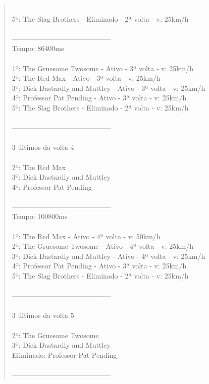 \documentclass[paper=a4, fontsize=11pt]{scrartcl}
\numberwithin{equation}{section}		%
\numberwithin{figure}{section}			%
\numberwithin{table}{section}				%
\begin{document}
\begin{quote}
\\5º: The Slag Brothers - Eliminado - 2ª volta - v: 25km/h
\\
\\------------------------------------------
\\Tempo: 86400ms
\\
\\1º: The Gruesome Twosome - Ativo - 3ª volta - v: 25km/h
\\2º: The Red Max - Ativo - 3ª volta - v: 25km/h
\\3º: Dick Dastardly and Muttley - Ativo - 3ª volta - v: 25km/h
\\4º: Professor Pat Pending - Ativo - 3ª volta - v: 25km/h
\\5º: The Slag Brothers - Eliminado - 2ª volta - v: 25km/h
\\
\\------------------------------------------
\\
\\3 últimos da volta 4
\\
\\2º: The Red Max
\\3º: Dick Dastardly and Muttley
\\4º: Professor Pat Pending
\\
\\------------------------------------------
\\Tempo: 100800ms
\\
\\1º: The Red Max - Ativo - 4ª volta - v: 50km/h
\\2º: The Gruesome Twosome - Ativo - 4ª volta - v: 25km/h
\\3º: Dick Dastardly and Muttley - Ativo - 4ª volta - v: 25km/h
\\4º: Professor Pat Pending - Ativo - 3ª volta - v: 25km/h
\\5º: The Slag Brothers - Eliminado - 2ª volta - v: 25km/h
\\
\\------------------------------------------
\\
\\3 últimos da volta 5
\\
\\2º: The Gruesome Twosome
\\3º: Dick Dastardly and Muttley
\\Eliminado: Professor Pat Pending
\\
\\------------------------------------------

\end{quote}
\end{document}
